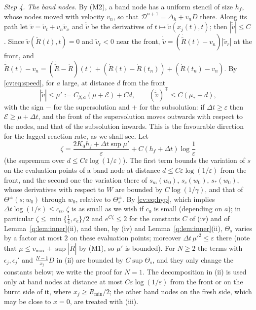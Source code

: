 \documentclass[11pt]{amsart}
\theoremstyle{definition}
\theoremstyle{remark}
\newcommand{\ve}{\varepsilon}
\begin{document}
\emph{Step 4. The band nodes.} By (M2), a band node has a
uniform stencil of size $h_f$, whose nodes moved with velocity $v_n$, so that
$\mathcal D^{n+1}=\Delta_h+v_nD$ there. Along its path let
$\dot{\tilde v}=\tilde v_t+v_n\tilde v_x$ and $\ddot{\tilde v}$ be the derivatives of
$t\mapsto\tilde v(x_j(t),t)$; then $|\ddot{\tilde v}|\le C$. Since
$\tilde v(\tilde R(t),t)=0$ and $\tilde v_r<0$ near the front,
$\dot{\tilde v}=(\dot{\tilde R}(t)-v_n)|\tilde v_r|$ at the front, and
$\dot{\tilde R}(t)-v_n=(\dot{\tilde R}-\dot R)(t)+(\dot R(t)-\dot R(t_n))+(\dot R(t_n)-v_n)$. By
\eqref{cv:eq:speed}, for $a$ large, at distance $d$ from the front
\begin{equation}\label{cv:eq:rel}
|\dot{\tilde v}|\le\mu':=C_{\beta,a}(\mu+\mathcal E)+Cd,\qquad
(\dot{\tilde v})^\mp\le C(\mu_*+d),
\end{equation}
with the sign $-$ for the supersolution and $+$ for the subsolution: if $\Delta t\ge\ve$ then
$\mathcal E\ge\mu+\Delta t$, and the front of the supersolution moves outwards with respect to the nodes,
and that of the subsolution inwards. This is the favourable direction for the lagged
reaction rate, as we shall see. Let
\[
\zeta=\frac{2K_0h_f+\Delta t\sup\mu'}{\ve}+C(h_f+\Delta t)\log\frac1\ve
\]
(the supremum over $d\le C\ve\log(1/\ve)$). The first term bounds the variation of $s$ on the
evaluation points of a band node at distance $d\le C\ve\log(1/\ve)$ from the front, and the
second one the variation there of $s_m(w_0)$, $s_c(w_0)$, $s_*(w_0)$, whose derivatives with
respect to $W$ are bounded by $C\log(1/\gamma)$, and that of $\Theta^\pm(s;w_0)$ through $w_0$, relative
to $\Theta^\pm_s$. By
\eqref{cv:eq:hyp}, which implies $\Delta t\log(1/\ve)\le c_0$, $\zeta$ is as small as we wish if
$c_0$ is small (depending on $a$); in particular $\zeta\le\min\{\frac14,c_e\}/2$ and
$e^{C\zeta}\le2$ for the constants $C$ of (iv) and of Lemma~\ref{q:lem:inner}(ii), and then, by
(iv) and Lemma~\ref{q:lem:inner}(ii), $\Theta_s$ varies by a factor at most $2$ on these
evaluation points; moreover
$\Delta t\,\mu'^2\le\ve$ there (note that $\mu\le v_{\max}+\sup|\dot R|$ by (M1), so $\mu'$ is
bounded). For $N\ge2$ the terms with $\epsilon_j,\epsilon_j'$ and $\frac{N-1}{x_j}D$ in (ii) are bounded by
$C\sup\Theta_s$, and they only change the constants below; we write the proof for $N=1$.
The decomposition in (ii) is used only at band nodes at distance at most
$C\ve\log(1/\ve)$ from the front or on the burnt side of it, where $x_j\ge R_{\min}/2$; the
other band nodes on the fresh side, which may be close to $x=0$, are treated with (iii).
\end{document}
